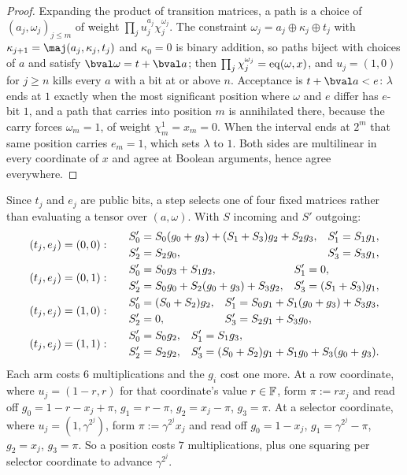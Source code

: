 \begin{proof}
Expanding the product of transition matrices, a path is a choice of $(a_j,\omega_j)_{j\le m}$ of weight $\prod_j u_j^{a_j}\chi_j^{\omega_j}$. The constraint $\omega_j=a_j\oplus\kappa_j\oplus t_j$ with $\kappa_{j+1}=\maj(a_j,\kappa_j,t_j)$ and $\kappa_0=0$ is binary addition, so paths biject with choices of $a$ and satisfy $\bval\omega=t+\bval a$; then $\prod_j\chi_j^{\omega_j}=\operatorname{eq}(\omega,x)$, and $u_j=(1,0)$ for $j\ge n$ kills every $a$ with a bit at or above $n$. Acceptance is $t+\bval a<e$: $\lambda$ ends at $1$ exactly when the most significant position where $\omega$ and $e$ differ has $e$-bit $1$, and a path that carries into position $m$ is annihilated there, because the carry forces $\omega_m=1$, of weight $\chi_m^1=x_m=0$. When the interval ends at $2^m$ that same position carries $e_m=1$, which sets $\lambda$ to $1$. Both sides are multilinear in every coordinate of $x$ and agree at Boolean arguments, hence agree everywhere.
\end{proof}

Since $t_j$ and $e_j$ are public bits, a step selects one of four fixed matrices rather than evaluating a tensor over $(a,\omega)$. With $S$ incoming and $S'$ outgoing:
\[
\renewcommand{\arraystretch}{1.25}
\begin{array}{l@{\qquad}l}
(t_j,e_j)=(0,0): &
\begin{aligned}
S_0'&=S_0(g_0+g_3)+(S_1+S_3)g_2+S_2g_3, & S_1'&=S_1g_1,\\
S_2'&=S_2g_0, & S_3'&=S_3g_1,
\end{aligned}\\[2.2ex]
(t_j,e_j)=(0,1): &
\begin{aligned}
S_0'&=S_0g_3+S_1g_2, & S_1'&=0,\\
S_2'&=S_0g_0+S_2(g_0+g_3)+S_3g_2, & S_3'&=(S_1+S_3)g_1,
\end{aligned}\\[2.2ex]
(t_j,e_j)=(1,0): &
\begin{aligned}
S_0'&=(S_0+S_2)g_2, & S_1'&=S_0g_1+S_1(g_0+g_3)+S_3g_3,\\
S_2'&=0, & S_3'&=S_2g_1+S_3g_0,
\end{aligned}\\[2.2ex]
(t_j,e_j)=(1,1): &
\begin{aligned}
S_0'&=S_0g_2, & S_1'&=S_1g_3,\\
S_2'&=S_2g_2, & S_3'&=(S_0+S_2)g_1+S_1g_0+S_3(g_0+g_3).
\end{aligned}
\end{array}
\]
Each arm costs $6$ multiplications and the $g_i$ cost one more. At a row coordinate, where $u_j=(1-r,r)$ for that coordinate's value $r\in\mathbb{F}$, form $\pi:=rx_j$ and read off $g_0=1-r-x_j+\pi$, $g_1=r-\pi$, $g_2=x_j-\pi$, $g_3=\pi$. At a selector coordinate, where $u_j=(1,\gamma^{2^j})$, form $\pi:=\gamma^{2^j}x_j$ and read off $g_0=1-x_j$, $g_1=\gamma^{2^j}-\pi$, $g_2=x_j$, $g_3=\pi$. So a position costs $7$ multiplications, plus one squaring per selector coordinate to advance $\gamma^{2^j}$.

